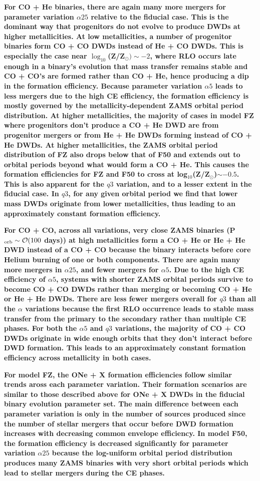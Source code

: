 \documentclass[twocolumn, linenumbers]{aastex631}
\begin{document}
\textbf{For CO + He binaries, there are again many more mergers for parameter variation $\alpha25$ relative to the fiducial case. This is the dominant way that progenitors do not evolve to produce DWDs at higher metallicities. At low metallicities, a number of progenitor binaries form CO + CO DWDs instead of He + CO DWDs. This is especially the case near $\log_{10}$(Z/Z$_\odot)\sim -2$, where RLO occurs late enough in a binary's evolution that mass transfer remains stable and CO + CO's are formed rather than CO + He, hence producing a dip in the formation efficiency. Because parameter variation $\alpha5$ leads to less mergers due to the high CE efficiency, the formation efficiency is mostly governed by the metallicity-dependent ZAMS orbital period distribution. At higher metallicities, the majority of cases in model FZ where progenitors don't produce a CO + He DWD are from progenitor mergers or from He + He DWDs forming instead of CO + He DWDs. At higher metallicities, the ZAMS orbital period distribution of FZ also drops below that of F50 and extends out to orbital periods beyond what would form a CO + He. This causes the formation efficiencies for FZ and F50 to cross at log$_{10}$(Z/Z$_\odot$)$\sim-0.5$. This is also apparent for the $q3$ variation, and to a lesser extent in the fiducial case. In $q3$, for any given orbital period we find that lower mass DWDs originate from lower metallicities, thus leading to an approximately constant formation efficiency.}

\textbf{For CO + CO, across all variations, very close ZAMS binaries (P$_{\rm{orb}}\sim\mathcal{O}(100$ days)) at high metallicities form a CO + He or He + He DWD instead of a CO + CO because the binary interacts before core Helium burning of one or both components. There are again many more mergers in $\alpha25$, and fewer mergers for $\alpha5$. Due to the high CE efficiency of $\alpha5$, systems with shorter ZAMS orbital periods survive to become CO + CO DWDs rather than merging or becoming CO + He or He + He DWDs. There are less fewer mergers overall for $q3$ than all the $\alpha$ variations because the first RLO occurrence leads to stable mass transfer from the primary to the secondary rather than multiple CE phases. For both the $\alpha5$ and $q3$ variations, the majority of CO + CO DWDs originate in wide enough orbits that they don't interact before DWD formation. This leads to an approximately constant formation efficiency across metallicity in both cases.}

\textbf{For model FZ, the ONe + X formation efficiencies follow similar trends aross each parameter variation. Their formation scenarios are similar to those described above for ONe + X DWDs in the fiducial binary evolution parameter set. The main difference between each parameter variation is only in the number of sources produced since the number of stellar mergers that occur before DWD formation increases with decreasing common envelope efficiency. In model F50, the formation efficiency is decreased significantly for parameter variation $\alpha25$ because the log-uniform orbital period distribution produces many ZAMS binaries with very short orbital periods which lead to stellar mergers during the CE phases.}
\end{document}
